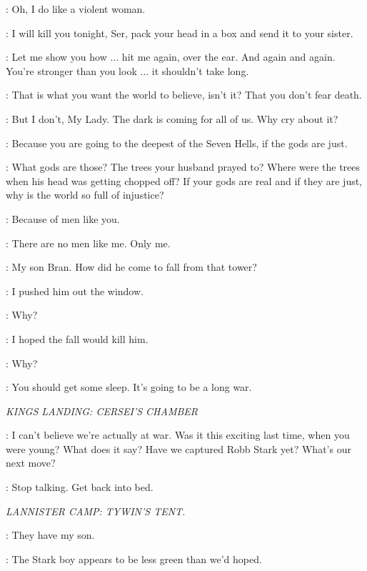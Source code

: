 
\JAIME: Oh, I do like a violent woman. 

\CATELYN: I will kill you tonight, Ser, pack your head in a box and send it to your sister. 

\JAIME: Let me show you how $\ldots$  hit me again, over the ear. And again and again. You're stronger than you look $\ldots$ it shouldn't take long. 

\CATELYN: That is what you want the world to believe, isn't it? That you don't fear death. 

\JAIME: But I don't, My Lady. The dark is coming for all of us. Why cry about it? 

\CATELYN: Because you are going to the deepest of the Seven Hells, if the gods are just. 

\JAIME: What gods are those? The trees your husband prayed to? Where were the trees when his head was getting chopped off? If your gods are real and if they are just, why is the world so full of injustice? 

\CATELYN: Because of men like you. 

\JAIME: There are no men like me. Only me. 

\CATELYN: My son Bran. How did he come to fall from that tower? 

\JAIME: I pushed him out the window. 

\CATELYN: Why? 

\JAIME: I hoped the fall would kill him. 

\CATELYN: Why? 

\JAIME: You should get some sleep. It's going to be a long war. 


\scene

\textit{KINGS LANDING: CERSEI'S CHAMBER}


\LANCEL: I can't believe we're actually at war. Was it this exciting last time, when you were young? What does it say? Have we captured Robb Stark yet? What's our next move? 

\CERSEI: Stop talking. Get back into bed. 


\scene

\textit{LANNISTER CAMP: TYWIN'S TENT.}


\TYWIN: They have my son. 

\TYRION: The Stark boy appears to be less green than we'd hoped. 

